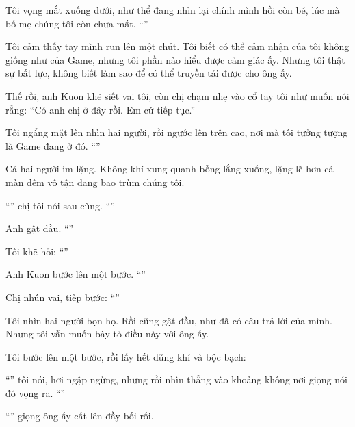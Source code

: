 \documentclass[../main.tex]{subfiles}
\begin{document}
Tôi vọng mắt xuống dưới, như thể đang nhìn lại chính mình hồi còn bé, lúc mà bố mẹ chúng tôi còn chưa mất. ``''

Tôi cảm thấy tay mình run lên một chút. Tôi biết có thể cảm nhận của tôi không giống như của Game, nhưng tôi phần nào hiểu được cảm giác ấy. Nhưng tôi thật sự bất lực, không biết làm sao để có thể truyền tải được cho ông ấy.

Thế rồi, anh Kuon khẽ siết vai tôi, còn chị chạm nhẹ vào cổ tay tôi như muốn nói rẳng: ``Có anh chị ở đây rồi. Em cứ tiếp tục.''

Tôi ngẩng mặt lên nhìn hai người, rồi ngước lên trên cao, nơi mà tôi tưởng tượng là Game đang ở đó. ``''

Cả hai người im lặng. Không khí xung quanh bỗng lắng xuống, lặng lẽ hơn cả màn đêm vô tận đang bao trùm chúng tôi.

``'' chị tôi nói sau cùng. ``''

Anh gật đầu. ``''

Tôi khẽ hỏi: ``''

Anh Kuon bước lên một bước. ``''

Chị nhún vai, tiếp bước: ``''

Tôi nhìn hai người bọn họ. Rồi cũng gật đầu, như đã có câu trả lời của mình. Nhưng tôi vẫn muốn bày tỏ điều này với ông ấy.

Tôi bước lên một bước, rồi lấy hết dũng khí và bộc bạch:

``'' tôi nói, hơi ngập ngừng, nhưng rồi nhìn thẳng vào khoảng không nơi giọng nói đó vọng ra. ``''

``'' giọng ông ấy cất lên đầy bối rối.
\end{document}
